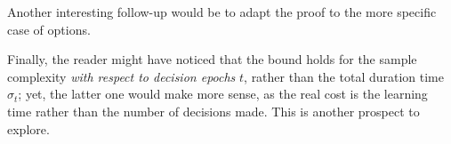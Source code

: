 Another interesting follow-up would be to adapt the proof to the more specific case of options.

Finally, the reader might have noticed that the bound holds for the sample complexity \emph{with respect to decision epochs} $t$, rather than the total duration time $\sigma_t$; yet, the latter one would make more sense, as the real cost is the learning time rather than the number of decisions made. This is another prospect to explore.
